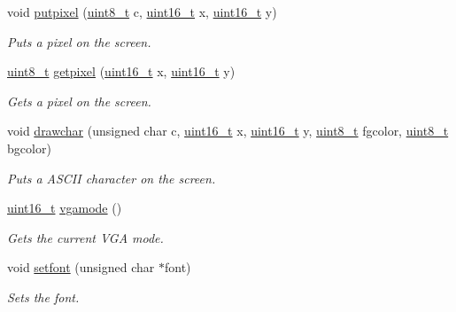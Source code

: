\begin{DoxyCompactItemize}
\item 
void \hyperlink{a00041_ab17a69b465efb1ebe54a6a2e5d7b7ce8_ab17a69b465efb1ebe54a6a2e5d7b7ce8}{putpixel} (\hyperlink{a00116_aba7bc1797add20fe3efdf37ced1182c5_aba7bc1797add20fe3efdf37ced1182c5}{uint8\+\_\+t} c, \hyperlink{a00116_a273cf69d639a59973b6019625df33e30_a273cf69d639a59973b6019625df33e30}{uint16\+\_\+t} x, \hyperlink{a00116_a273cf69d639a59973b6019625df33e30_a273cf69d639a59973b6019625df33e30}{uint16\+\_\+t} y)
\begin{DoxyCompactList}\small\item\em Puts a pixel on the screen. \end{DoxyCompactList}\item 
\hyperlink{a00116_aba7bc1797add20fe3efdf37ced1182c5_aba7bc1797add20fe3efdf37ced1182c5}{uint8\+\_\+t} \hyperlink{a00041_aac0685da0bbf1115c2b76b0aedf7e1f0_aac0685da0bbf1115c2b76b0aedf7e1f0}{getpixel} (\hyperlink{a00116_a273cf69d639a59973b6019625df33e30_a273cf69d639a59973b6019625df33e30}{uint16\+\_\+t} x, \hyperlink{a00116_a273cf69d639a59973b6019625df33e30_a273cf69d639a59973b6019625df33e30}{uint16\+\_\+t} y)
\begin{DoxyCompactList}\small\item\em Gets a pixel on the screen. \end{DoxyCompactList}\item 
void \hyperlink{a00041_a2c8df7a20b47341b70d97a7ff21d86ea_a2c8df7a20b47341b70d97a7ff21d86ea}{drawchar} (unsigned char c, \hyperlink{a00116_a273cf69d639a59973b6019625df33e30_a273cf69d639a59973b6019625df33e30}{uint16\+\_\+t} x, \hyperlink{a00116_a273cf69d639a59973b6019625df33e30_a273cf69d639a59973b6019625df33e30}{uint16\+\_\+t} y, \hyperlink{a00116_aba7bc1797add20fe3efdf37ced1182c5_aba7bc1797add20fe3efdf37ced1182c5}{uint8\+\_\+t} fgcolor, \hyperlink{a00116_aba7bc1797add20fe3efdf37ced1182c5_aba7bc1797add20fe3efdf37ced1182c5}{uint8\+\_\+t} bgcolor)
\begin{DoxyCompactList}\small\item\em Puts a A\+S\+C\+II character on the screen. \end{DoxyCompactList}\item 
\hyperlink{a00116_a273cf69d639a59973b6019625df33e30_a273cf69d639a59973b6019625df33e30}{uint16\+\_\+t} \hyperlink{a00041_af6d170c9401ea8f94d4c5cf09347cca7_af6d170c9401ea8f94d4c5cf09347cca7}{vgamode} ()
\begin{DoxyCompactList}\small\item\em Gets the current V\+GA mode. \end{DoxyCompactList}\item 
void \hyperlink{a00041_abb01dc16ea34f0a6de3d10d732b6c536_abb01dc16ea34f0a6de3d10d732b6c536}{setfont} (unsigned char $\ast$font)
\begin{DoxyCompactList}\small\item\em Sets the font. \end{DoxyCompactList}\end{DoxyCompactItemize}
